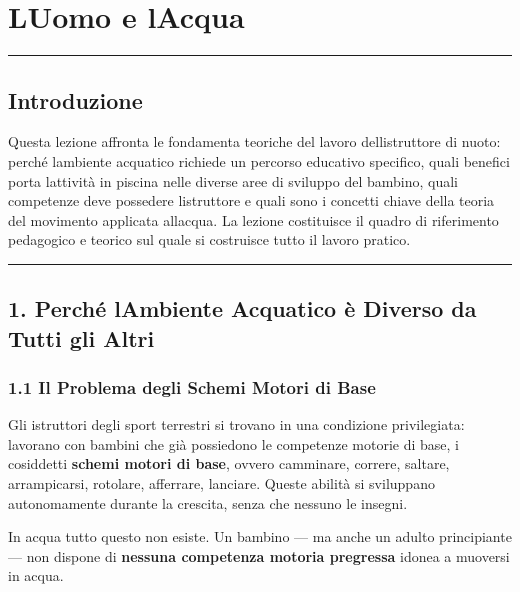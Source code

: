 \documentclass[a4paper,11pt]{article}
\begin{document}
\section{L\textquotesingle Uomo e
  l\textquotesingle Acqua}\label{luomo-e-lacqua}

\begin{center}\rule{0.5\linewidth}{0.5pt}\end{center}

\subsection{Introduzione}\label{introduzione-9}

Questa lezione affronta le fondamenta teoriche del lavoro
dell\textquotesingle istruttore di nuoto: perché
l\textquotesingle ambiente acquatico richiede un percorso educativo
specifico, quali benefici porta l\textquotesingle attività in piscina
nelle diverse aree di sviluppo del bambino, quali competenze deve
possedere l\textquotesingle istruttore e quali sono i concetti chiave
della teoria del movimento applicata all\textquotesingle acqua. La
lezione costituisce il quadro di riferimento pedagogico e teorico sul
quale si costruisce tutto il lavoro pratico.

\begin{center}\rule{0.5\linewidth}{0.5pt}\end{center}

\subsection{1. Perché l\textquotesingle Ambiente Acquatico è Diverso da
      Tutti gli
      Altri}\label{perchuxe9-lambiente-acquatico-uxe8-diverso-da-tutti-gli-altri}

\subsubsection{1.1 Il Problema degli Schemi Motori di
      Base}\label{il-problema-degli-schemi-motori-di-base}

Gli istruttori degli sport terrestri si trovano in una condizione
privilegiata: lavorano con bambini che già possiedono le competenze
motorie di base, i cosiddetti \textbf{schemi motori di base}, ovvero
camminare, correre, saltare, arrampicarsi, rotolare, afferrare,
lanciare. Queste abilità si sviluppano autonomamente durante la
crescita, senza che nessuno le insegni.

In acqua tutto questo non esiste. Un bambino --- ma anche un adulto
principiante --- non dispone di \textbf{nessuna competenza motoria
      pregressa} idonea a muoversi in acqua.
\end{document}
